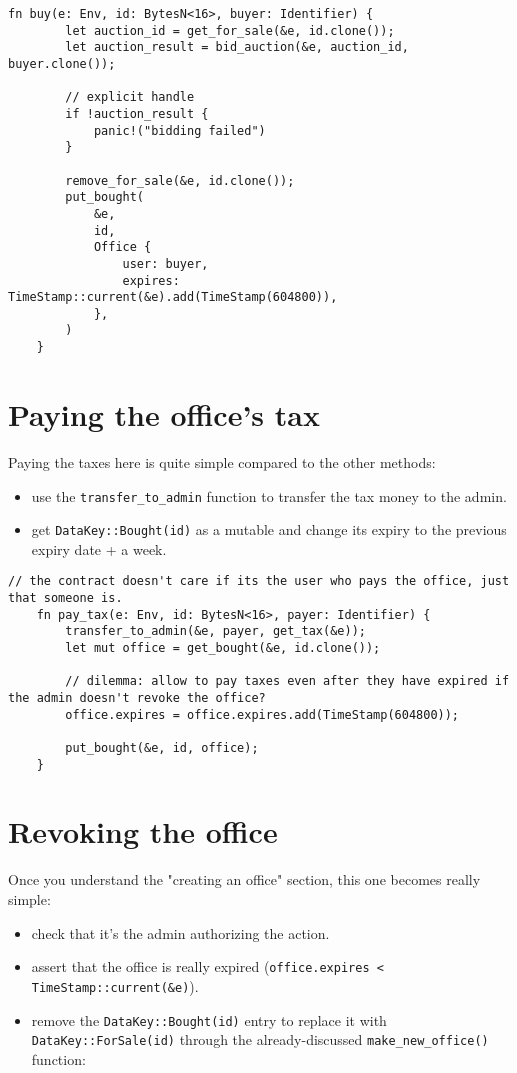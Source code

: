 \documentclass[10pt]{article}
\begin{document}
\begin{verbatim}
fn buy(e: Env, id: BytesN<16>, buyer: Identifier) {
        let auction_id = get_for_sale(&e, id.clone());
        let auction_result = bid_auction(&e, auction_id, buyer.clone());

        // explicit handle
        if !auction_result {
            panic!("bidding failed")
        }

        remove_for_sale(&e, id.clone());
        put_bought(
            &e,
            id,
            Office {
                user: buyer,
                expires: TimeStamp::current(&e).add(TimeStamp(604800)),
            },
        )
    }

\end{verbatim}

\section*{Paying the office's tax}
Paying the taxes here is quite simple compared to the other methods:

\begin{itemize}
  \item use the \texttt{transfer\_to\_admin} function to transfer the tax money to the admin.
  \item get \texttt{DataKey::Bought(id)} as a mutable and change its expiry to the previous expiry date + a week.
\end{itemize}

\begin{verbatim}
// the contract doesn't care if its the user who pays the office, just that someone is.
    fn pay_tax(e: Env, id: BytesN<16>, payer: Identifier) {
        transfer_to_admin(&e, payer, get_tax(&e));
        let mut office = get_bought(&e, id.clone());

        // dilemma: allow to pay taxes even after they have expired if the admin doesn't revoke the office?
        office.expires = office.expires.add(TimeStamp(604800));

        put_bought(&e, id, office);
    }
\end{verbatim}

\section*{Revoking the office}
Once you understand the "creating an office" section, this one becomes really simple:

\begin{itemize}
  \item check that it's the admin authorizing the action.
  \item assert that the office is really expired (\texttt{office.expires < TimeStamp::current(\&e)}).
  \item remove the \texttt{DataKey::Bought(id)} entry to replace it with \texttt{DataKey::ForSale(id)} through the already-discussed \texttt{make\_new\_office()} function:
\end{itemize}
\end{document}
